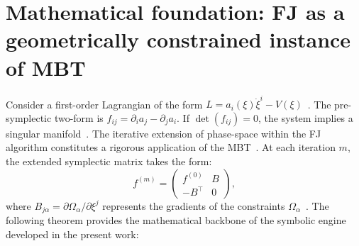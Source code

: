\documentclass[11pt,a4paper]{article}
\begin{document}
	
	
	
	\section{Mathematical foundation: FJ as a geometrically constrained instance of MBT}\label{sec2}
	
	
	
	Consider a first-order Lagrangian of the form $L = a_i(\xi) \dot{\xi}^i - V(\xi)$~\cite{FaddeevJackiw1988,Henneaux1992}. The pre-symplectic two-form is $f_{ij} = \partial_i a_j - \partial_j a_i$. If $\det(f_{ij}) = 0$, the system implies a singular manifold~\cite{Gotay1978,Crnkovic1987}. The iterative extension of phase-space within the FJ algorithm constitutes a rigorous application of the MBT~\cite{GolubVanLoan2013,Galantai2001}. At each iteration $m$, the extended symplectic matrix takes the form:
	\[
	f^{(m)} = \begin{pmatrix} f^{(0)} & B \\ -B^\top & 0 \end{pmatrix},
	\]
	where $B_{j\alpha} = \partial \Omega_\alpha / \partial \xi^j$ represents the gradients of the constraints $\Omega_\alpha$~\cite{BarcelosNetoWotzasek1992}. The following theorem provides the mathematical backbone of the symbolic engine developed in the present work:
	
	
	
\end{document}
